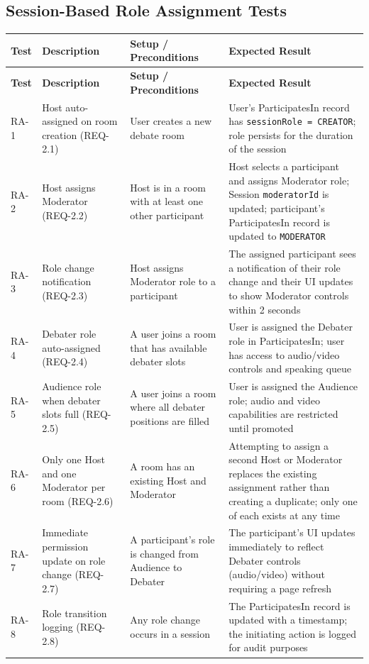 \documentclass[12pt]{article}
\begin{document}
\subsection{Session-Based Role Assignment Tests}

\begin{longtable}{|p{1.5cm}|p{3cm}|p{4cm}|p{4cm}|}
\hline
\textbf{Test} & \textbf{Description} & \textbf{Setup / Preconditions} & \textbf{Expected Result} \\
\hline
\endfirsthead
\hline
\textbf{Test} & \textbf{Description} & \textbf{Setup / Preconditions} & \textbf{Expected Result} \\
\hline
\endhead
RA-1 & Host auto-assigned on room creation (REQ-2.1) & User creates a new debate room & User's ParticipatesIn record has \texttt{sessionRole = CREATOR}; role persists for the duration of the session \\
\hline
RA-2 & Host assigns Moderator (REQ-2.2) & Host is in a room with at least one other participant & Host selects a participant and assigns Moderator role; Session \texttt{moderatorId} is updated; participant's ParticipatesIn record is updated to \texttt{MODERATOR} \\
\hline
RA-3 & Role change notification (REQ-2.3) & Host assigns Moderator role to a participant & The assigned participant sees a notification of their role change and their UI updates to show Moderator controls within 2 seconds \\
\hline
RA-4 & Debater role auto-assigned (REQ-2.4) & A user joins a room that has available debater slots & User is assigned the Debater role in ParticipatesIn; user has access to audio/video controls and speaking queue \\
\hline
RA-5 & Audience role when debater slots full (REQ-2.5) & A user joins a room where all debater positions are filled & User is assigned the Audience role; audio and video capabilities are restricted until promoted \\
\hline
RA-6 & Only one Host and one Moderator per room (REQ-2.6) & A room has an existing Host and Moderator & Attempting to assign a second Host or Moderator replaces the existing assignment rather than creating a duplicate; only one of each exists at any time \\
\hline
RA-7 & Immediate permission update on role change (REQ-2.7) & A participant's role is changed from Audience to Debater & The participant's UI updates immediately to reflect Debater controls (audio/video) without requiring a page refresh \\
\hline
RA-8 & Role transition logging (REQ-2.8) & Any role change occurs in a session & The ParticipatesIn record is updated with a timestamp; the initiating action is logged for audit purposes \\
\hline
\end{longtable}
\end{document}
